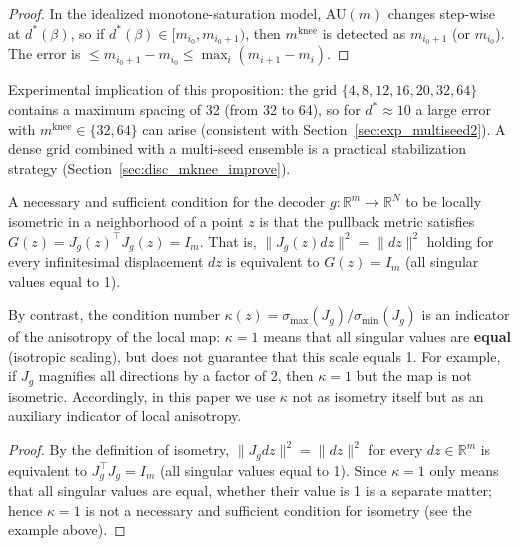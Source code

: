 \documentclass[make,article,submit,pdftex,moreauthors]{Definitions/mdpi}
\newcommand{\Jg}{J_g}
\newcommand{\R}{\mathbb{R}}
\newcommand{\kap}{\kappa}
\newcommand{\mknee}{m^{\mathrm{knee}}}
\begin{document}
\begin{proof}
In the idealized monotone-saturation model, AU$(m)$ changes step-wise at $d^*(\beta)$,
so if $d^*(\beta) \in [m_{i_0}, m_{i_0+1})$, then $\mknee$ is detected as
$m_{i_0+1}$ (or $m_{i_0}$).
The error is $\leq m_{i_0+1} - m_{i_0} \leq \max_i(m_{i+1}-m_i)$.
\end{proof}

\begin{Remark}
Experimental implication of this proposition: the grid $\{4,8,12,16,20,32,64\}$ contains
a maximum spacing of 32 (from 32 to 64), so for $d^* \approx 10$ a large error with
$\mknee \in \{32, 64\}$ can arise (consistent with Section~\ref{sec:exp_multiseed2}).
A dense grid combined with a multi-seed ensemble is a practical stabilization strategy
(Section~\ref{sec:disc_mknee_improve}).
\end{Remark}

\begin{Proposition}\label{thm:pullback}
A necessary and sufficient condition for the decoder $g: \R^m \to \R^N$ to be locally
isometric in a neighborhood of a point $z$ is that the pullback metric satisfies
$G(z) = \Jg(z)^\top \Jg(z) = I_m$.
That is, $\|\Jg(z)dz\|^2 = \|dz\|^2$ holding for every infinitesimal displacement $dz$
is equivalent to $G(z)=I_m$ (all singular values equal to 1).

By contrast, the condition number $\kap(z) = \sigma_{\max}(\Jg) / \sigma_{\min}(\Jg)$
is an indicator of the anisotropy of the local map: $\kap = 1$ means that all singular
values are \textbf{equal} (isotropic scaling), but does not guarantee that this scale
equals 1.
For example, if $\Jg$ magnifies all directions by a factor of 2, then $\kap=1$ but the
map is not isometric.
Accordingly, in this paper we use $\kap$ not as isometry itself but as an auxiliary
indicator of local anisotropy.
\end{Proposition}

\begin{proof}
By the definition of isometry, $\|J_g dz\|^2 = \|dz\|^2$ for every $dz \in \R^m$ is
equivalent to $J_g^\top J_g = I_m$ (all singular values equal to 1).
Since $\kap = 1$ only means that all singular values are equal, whether their value is 1
is a separate matter; hence $\kap=1$ is not a necessary and sufficient condition for
isometry (see the example above).
\end{proof}
\end{document}
